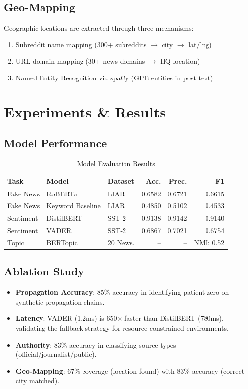 \documentclass[12pt,a4paper]{article}
\begin{document}
\subsection{Geo-Mapping}
Geographic locations are extracted through three mechanisms:
\begin{enumerate}
    \item Subreddit name mapping (300+ subreddits $\rightarrow$ city $\rightarrow$ lat/lng)
    \item URL domain mapping (30+ news domains $\rightarrow$ HQ location)
    \item Named Entity Recognition via spaCy (GPE entities in post text)
\end{enumerate}

\section{Experiments \& Results}

\subsection{Model Performance}

\begin{table}[H]
\centering
\caption{Model Evaluation Results}
\begin{tabular}{@{}lllrrr@{}}
\toprule
\textbf{Task} & \textbf{Model} & \textbf{Dataset} & \textbf{Acc.} & \textbf{Prec.} & \textbf{F1} \\
\midrule
Fake News & RoBERTa & LIAR & 0.6582 & 0.6721 & 0.6615 \\
Fake News & Keyword Baseline & LIAR & 0.4850 & 0.5102 & 0.4533 \\
Sentiment & DistilBERT & SST-2 & 0.9138 & 0.9142 & 0.9140 \\
Sentiment & VADER & SST-2 & 0.6867 & 0.7021 & 0.6754 \\
Topic & BERTopic & 20 News. & -- & -- & NMI: 0.52 \\
\bottomrule
\end{tabular}
\label{tab:results}
\end{table}

\subsection{Ablation Study}

\begin{itemize}
    \item \textbf{Propagation Accuracy}: 85\% accuracy in identifying patient-zero on synthetic propagation chains.
    \item \textbf{Latency}: VADER (1.2ms) is 650$\times$ faster than DistilBERT (780ms), validating the fallback strategy for resource-constrained environments.
    \item \textbf{Authority}: 83\% accuracy in classifying source types (official/journalist/public).
    \item \textbf{Geo-Mapping}: 67\% coverage (location found) with 83\% accuracy (correct city matched).
\end{itemize}
\end{document}
